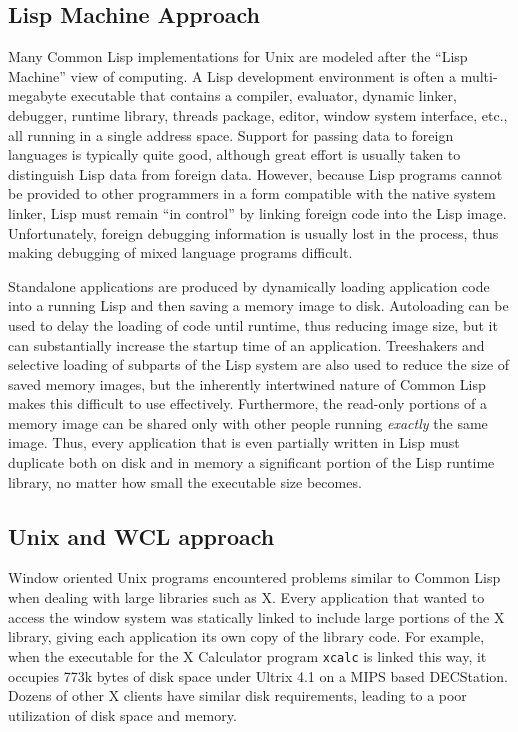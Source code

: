 \subsection{Lisp Machine Approach}

Many Common Lisp implementations for Unix are modeled after
the ``Lisp Machine'' view of computing. A Lisp development
environment is often a multi-megabyte executable that contains a
compiler, evaluator, dynamic linker, debugger, runtime library,
threads package, editor, window system interface, etc., all running in
a single address space. Support for passing data to foreign languages
is typically quite good, although great effort is usually taken to
distinguish Lisp data from foreign data.  However, because Lisp
programs cannot be provided to other programmers in a form compatible
with the native system linker, Lisp must remain ``in control'' by
linking foreign code into the Lisp image.  Unfortunately, foreign
debugging information is usually lost in the process, thus making
debugging of mixed language programs difficult.

Standalone applications are produced by dynamically loading
application code into a running Lisp and then saving a memory image to
disk. Autoloading can be used to delay the loading of code until
runtime, thus reducing image size, but it can substantially increase
the startup time of an application.  Treeshakers and selective loading
of subparts of the Lisp system are also used to reduce the size of
saved memory images, but the inherently intertwined nature of
Common Lisp makes this difficult to use effectively. Furthermore, the
read-only portions of a memory image can be shared only with other
people running {\it exactly} the same image. Thus, every application
that is even partially written in Lisp must duplicate both on disk and
in memory a significant portion of the Lisp runtime library, no matter
how small the executable size becomes.

\subsection{Unix and WCL approach}

Window oriented Unix programs encountered problems similar to Common
Lisp when dealing with large libraries such as X. Every application
that wanted to access the window system was statically linked to
include large portions of the X library, giving each application its
own copy of the library code. For example, when the executable for the
X Calculator program {\tt xcalc} is linked this way, it occupies 773k
bytes of disk space under Ultrix 4.1 on a MIPS based DECStation.
Dozens of other X clients have similar disk requirements, leading to a
poor utilization of disk space and memory.

